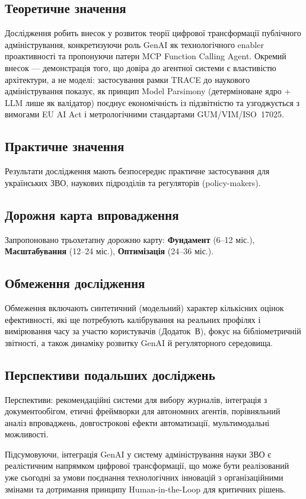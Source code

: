\subsection*{Теоретичне значення}

Дослідження робить внесок у розвиток теорії цифрової трансформації публічного адміністрування, конкретизуючи роль GenAI як технологічного enabler проактивності та пропонуючи патерн MCP Function Calling Agent.
\iftrace
Окремий внесок --- демонстрація того, що довіра до агентної системи є властивістю архітектури, а не моделі: застосування рамки TRACE до наукового адміністрування показує, як принцип Model Parsimony (детерміноване ядро + LLM лише як валідатор) поєднує економічність із підзвітністю та узгоджується з вимогами EU AI Act і метрологічними стандартами GUM/VIM/ISO~17025.
\fi

\subsection*{Практичне значення}

Результати дослідження мають безпосереднє практичне застосування для українських ЗВО, наукових підрозділів та регуляторів (policy-makers).

\subsection*{Дорожня карта впровадження}

Запропоновано трьохетапну дорожню карту: \textbf{Фундамент} (6--12 міс.), \textbf{Масштабування} (12--24 міс.), \textbf{Оптимізація} (24--36 міс.).

\subsection*{Обмеження дослідження}

Обмеження включають синтетичний (модельний) характер кількісних оцінок ефективності, які ще потребують калібрування на реальних профілях і вимірювання часу за участю користувачів (Додаток~В), фокус на бібліометричній звітності, а також динаміку розвитку GenAI й регуляторного середовища.

\subsection*{Перспективи подальших досліджень}

Перспективи: рекомендаційні системи для вибору журналів, інтеграція з документообігом, етичні фреймворки для автономних агентів, порівняльний аналіз впроваджень, довгострокові ефекти автоматизації, мультимодальні можливості.

\bigskip

Підсумовуючи, інтеграція GenAI у систему адміністрування науки ЗВО є реалістичним напрямком цифрової трансформації, що може бути реалізований уже сьогодні за умови поєднання технологічних інновацій з організаційними змінами та дотримання принципу Human-in-the-Loop для критичних рішень.